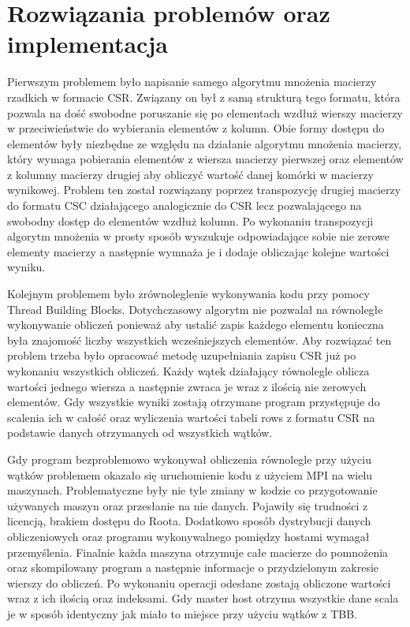 \documentclass[a4paper,titlepage,12pt]{article}
\begin{document}
\section{Rozwiązania problemów oraz implementacja}
\label{sec:rozwiazania}
Pierwszym problemem było napisanie samego algorytmu mnożenia macierzy rzadkich w formacie CSR. Związany on był z samą strukturą tego formatu, która pozwala na dość swobodne poruszanie się po elementach wzdłuż wierszy macierzy w przeciwieństwie do wybierania elementów z kolumn. Obie formy dostępu do elementów były niezbędne ze względu na działanie algorytmu mnożenia macierzy, który wymaga pobierania elementów z wiersza macierzy pierwszej oraz elementów z kolumny macierzy drugiej aby obliczyć wartość danej komórki w macierzy wynikowej. Problem ten został rozwiązany poprzez transpozycję drugiej macierzy do formatu CSC działającego analogicznie do CSR lecz pozwalającego na swobodny dostęp do elementów wzdłuż kolumn. Po wykonaniu transpozycji algorytm mnożenia w prosty sposób wyszukuje odpowiadające sobie nie zerowe elementy macierzy a następnie wymnaża je i dodaje obliczając kolejne wartości wyniku.

Kolejnym problemem było zrównoleglenie wykonywania kodu przy pomocy Thread Building Blocks. Dotychczasowy algorytm nie pozwalał na równoległe wykonywanie obliczeń ponieważ aby ustalić zapis każdego elementu konieczna była znajomość liczby wszystkich wcześniejszych elementów. Aby rozwiązać ten problem trzeba było opracować metodę uzupełniania zapisu CSR już po wykonaniu wszystkich obliczeń. Każdy wątek działający równolegle oblicza wartości jednego wiersza a następnie zwraca je wraz z ilością nie zerowych elementów. Gdy wszystkie wyniki zostają otrzymane program przystępuje do scalenia ich w całość oraz wyliczenia wartości tabeli rows z formatu CSR na podstawie danych otrzymanych od wszystkich wątków.

Gdy program bezproblemowo wykonywał obliczenia równolegle przy użyciu wątków problemem okazało się uruchomienie kodu z użyciem MPI na wielu maszynach. Problematyczne były nie tyle zmiany w kodzie co przygotowanie używanych maszyn oraz przesłanie na nie danych. Pojawiły się trudności z licencją, brakiem dostępu do Roota. Dodatkowo sposób dystrybucji danych obliczeniowych oraz programu wykonywalnego pomiędzy hostami wymagał przemyślenia. Finalnie każda maszyna otrzymuje całe macierze do pomnożenia oraz skompilowany program a następnie informacje o przydzielonym zakresie wierszy do obliczeń. Po wykonaniu operacji odesłane zostają obliczone wartości wraz z ich ilością oraz indeksami. Gdy master host otrzyma wszystkie dane scala je w sposób identyczny jak miało to miejsce przy użyciu wątków z TBB.
\end{document}
